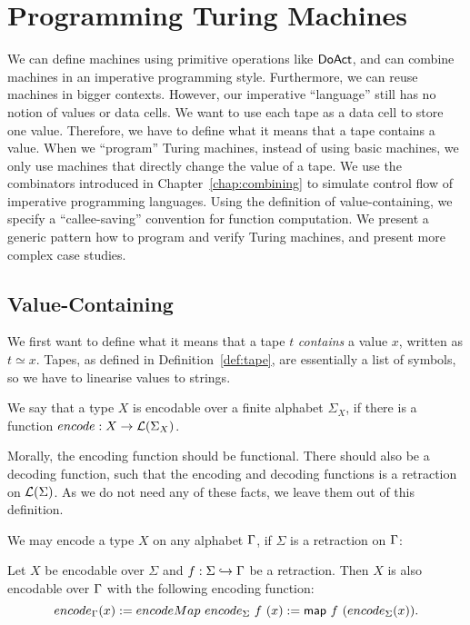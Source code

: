 \chapter{Programming Turing Machines}
\label{chap:programming}

We can define machines using primitive operations like $\mathsf{DoAct}$, and can combine machines in an imperative programming style.  Furthermore, we can
reuse machines in bigger contexts.  However, our imperative ``language'' still has no notion of values or data cells.  We want to use each tape as a
data cell to store one value.  Therefore, we have to define what it means that a tape contains a value.  When we ``program'' Turing machines, instead
of using basic machines, we only use machines that directly change the value of a tape.  We use the combinators introduced in
Chapter~\ref{chap:combining} to simulate control flow of imperative programming languages.  Using the definition of value-containing, we specify a
``callee-saving'' convention for function computation.  We present a generic pattern how to program and verify Turing machines, and present more
complex case studies.


\section{Value-Containing}
\label{sec:value-containing}

We first want to define what it means that a tape $t$ \emph{contains} a value $x$, written as $t \simeq x$.  Tapes, as defined in
Definition~\ref{def:tape}, are essentially a list of symbols, so we have to linearise values to strings.

\begin{definition}
  \label{def:encodable}
  We say that a type $X$ is encodable over a finite alphabet $\Sigma_X$, if there is a function $encode : X \rightarrow \mathcal{L}(\Sigma_X)$.
\end{definition}

Morally, the encoding function should be functional.  There should also be a decoding function, such that the encoding and decoding functions is a
retraction on $\mathcal{L}(\Sigma)$.  As we do not need any of these facts, we leave them out of this definition.

We may encode a type $X$ on any alphabet $\Gamma$, if $\Sigma$ is a retraction on $\Gamma$:
\begin{definition}
  \label{def:Encode_map}
  Let $X$ be encodable over $\Sigma$ and $f : \Sigma \hookrightarrow \Gamma$ be a retraction.  Then $X$ is also encodable over $\Gamma$ with the following
  encoding function:
  \[ encode_\Gamma(x) := encodeMap~encode_\Sigma~f~(x) := \mathsf{map}~f~(encode_\Sigma(x)). \]
\end{definition}

